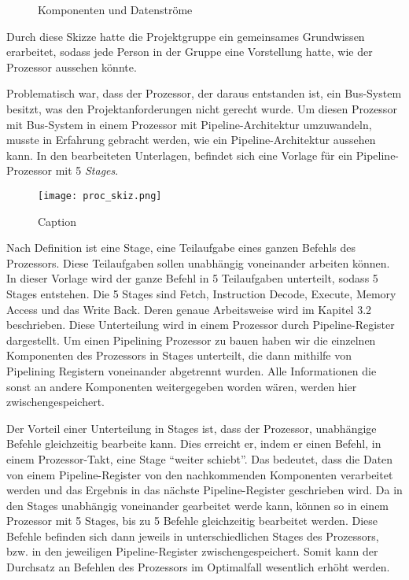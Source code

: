 \documentclass[paper=a4,fontsize=12pt,twocolumn]{scrreprt}
\begin{document}
\begin{figure}[h]
\centering
\caption{Komponenten und Datenströme}
\end{figure}

Durch diese Skizze hatte die Projektgruppe ein gemeinsames Grundwissen erarbeitet, sodass jede Person in der Gruppe eine Vorstellung hatte, wie der Prozessor aussehen könnte.

Problematisch war, dass der Prozessor, der daraus entstanden ist, ein Bus-System besitzt, was den Projektanforderungen nicht gerecht wurde.
Um diesen Prozessor mit Bus-System in einem Prozessor mit Pipeline-Architektur umzuwandeln, musste in Erfahrung gebracht werden, wie ein Pipeline-Architektur aussehen kann.
In den bearbeiteten Unterlagen, befindet sich eine Vorlage für ein Pipeline-Prozessor mit 5 \textit{Stages}.

\begin{figure}
    \centering
    \texttt{[image: proc\_skiz.png]}
    \caption{Caption}
    \label{fig:my_label}
\end{figure}

Nach Definition ist eine Stage, eine Teilaufgabe eines ganzen Befehls des Prozessors.
Diese Teilaufgaben sollen unabhängig voneinander arbeiten können.
In dieser Vorlage wird der ganze Befehl in 5 Teilaufgaben unterteilt, sodass 5 Stages entstehen.
Die 5 Stages sind Fetch, Instruction Decode, Execute, Memory Access und das Write Back.
Deren genaue Arbeitsweise wird im Kapitel 3.2 beschrieben.
Diese Unterteilung wird in einem Prozessor durch Pipeline-Register dargestellt.
Um einen Pipelining Prozessor zu bauen haben wir die einzelnen Komponenten des Prozessors in Stages unterteilt, die dann mithilfe von Pipelining Registern voneinander abgetrennt wurden.
Alle Informationen die sonst an andere Komponenten weitergegeben worden wären, werden hier zwischengespeichert.

Der Vorteil einer Unterteilung in Stages ist, dass der Prozessor, unabhängige Befehle gleichzeitig bearbeite kann.
Dies erreicht er, indem er einen Befehl, in einem Prozessor-Takt, eine Stage \enquote{weiter schiebt}.
Das bedeutet, dass die Daten von einem Pipeline-Register von den nachkommenden Komponenten verarbeitet werden und das Ergebnis in das nächste Pipeline-Register geschrieben wird. 
Da in den Stages unabhängig voneinander gearbeitet werde kann, können so in einem Prozessor mit 5 Stages, bis zu 5 Befehle gleichzeitig bearbeitet werden. 
Diese Befehle befinden sich dann jeweils in unterschiedlichen Stages des Prozessors, bzw. in den jeweiligen Pipeline-Register zwischengespeichert.
Somit kann der Durchsatz an Befehlen des Prozessors im Optimalfall wesentlich erhöht werden.
\end{document}
